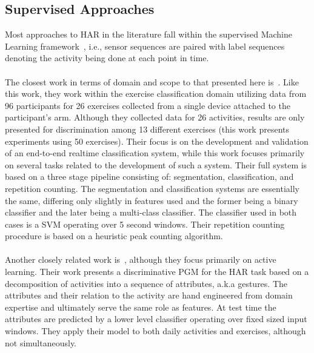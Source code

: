 \documentclass[12pt]{report}
\newcommand{\1}[0]{\mathbbm{1}}
\begin{document}
\subsection{Supervised Approaches}
Most approaches to \ac{HAR} in the literature fall within the
supervised Machine Learning framework~\cite{har-survey}, i.e.,
sensor sequences are paired with label sequences denoting the activity
being done at each point in time.
\\\\
The closest work in terms of domain and scope to that presented here is~\cite{ms-activity}.
Like this work, they work within the exercise classification domain utilizing data
from 96 participants for 26 exercises collected from a single device attached to the
participant's arm. Although they collected data for 26 activities,
results are only presented for discrimination among 13 different
exercises (this work presents experiments using 50 exercises). Their focus is on the development
and validation of an end-to-end realtime classification system, while this work focuses primarily on
several tasks related to the development of such a system. Their full system is based on a three
stage pipeline consisting of: segmentation, classification, and repetition counting. The segmentation
and classification systems are essentially the same, differing only slightly in features used and the
former being a binary classifier and the later being a multi-class classifier. The classifier used
in both cases is a \ac{SVM} operating over 5 second windows. Their repetition counting procedure
is based on a heuristic peak counting algorithm.
\\\\
Another closely related work is~\cite{hierarchical-thesis}, although they focus
primarily on active learning. Their work presents a discriminative \ac{PGM} for the \ac{HAR}
task based on a decomposition of activities into a sequence of attributes, a.k.a gestures.
The attributes and their relation to the activity are hand engineered from domain expertise
and ultimately serve the same role as features. At test time the attributes are predicted by a
lower level classifier operating over fixed sized input windows. They apply their model to both
daily activities and exercises, although not simultaneously.
\end{document}
